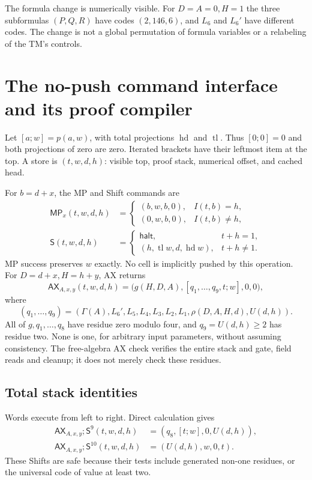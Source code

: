 \documentclass[11pt,letterpaper]{article}
\newcommand{\AX}{\mathsf{AX}}
\newcommand{\MP}{\mathsf{MP}}
\newcommand{\Shift}{\mathsf S}
\begin{document}
The formula change is numerically visible. For $D=A=0,H=1$ the three
subformulas $(P,Q,R)$ have codes $(2,146,6)$, and $L_6$ and $L_6'$ have
different codes. The change is not a global permutation of formula variables
or a relabeling of the TM's controls.

\section{The no-push command interface and its proof compiler}
\label{sec:commands}

Let $[a;w]=p(a,w)$, with total projections $\operatorname{hd}$ and
$\operatorname{tl}$. Thus $[0;0]=0$ and both projections of zero are zero.
Iterated brackets have their leftmost item at the top. A store is
$(t,w,d,h)$: visible top, proof stack, numerical offset, and cached head.

For $b=d+x$, the MP and Shift commands are
\begin{align*}
\MP_x(t,w,d,h)&=
\begin{cases}(b,w,b,0),&I(t,b)=h,\\(0,w,b,0),&I(t,b)\ne h,\end{cases}\\
\Shift(t,w,d,h)&=
\begin{cases}\mathsf{halt},&t+h=1,\\
(h,\operatorname{tl}w,d,\operatorname{hd}w),&t+h\ne1.
\end{cases}
\end{align*}
MP success preserves $w$ exactly. No cell is implicitly pushed by this
operation. For $D=d+x,H=h+y$, AX returns
\[
\AX_{A,x,y}(t,w,d,h)
 =\bigl(g(H,D,A),[q_1,\ldots,q_9,t;w],0,0\bigr),
\]
where
\[
(q_1,\ldots,q_9)=
(\Gamma(A),L_6',L_5,L_4,L_3,L_2,L_1,\rho(D,A,H,d),U(d,h)).
\]
All of $g,q_1,\ldots,q_8$ have residue zero modulo four, and
$q_9=U(d,h)\ge2$ has residue two. None is one, for arbitrary input
parameters, without assuming consistency. The free-algebra AX check verifies
the entire stack and gate, field reads and cleanup; it does not merely
check these residues.

\subsection{Total stack identities}

Words execute from left to right. Direct calculation gives
\begin{align*}
\AX_{A,x,y};\Shift^9(t,w,d,h)&=(q_8,[t;w],0,U(d,h)),\\
\AX_{A,x,y};\Shift^{10}(t,w,d,h)&=(U(d,h),w,0,t).
\end{align*}
These Shifts are safe because their tests include generated non-one
residues, or the universal code of value at least two.
\end{document}
